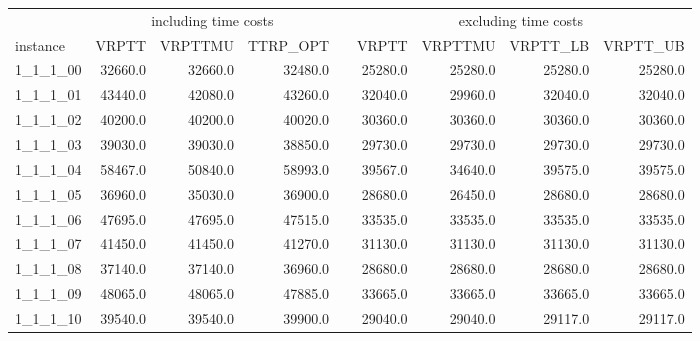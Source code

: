 %
\setlength\LTleft{-1in}
\setlength\LTright{-1in}
%
%
%
\begin{longtable}{lrrrcrrrr}
\toprule
%
& \multicolumn{3}{c}{including time costs} & \phantom{a}& \multicolumn{4}{c}{excluding time costs} \\
\cmidrule{2-4} \cmidrule{6-9}
%
%
%
instance &  VRPTT &  VRPTTMU &  TTRP\_OPT &&  VRPTT &  VRPTTMU &  VRPTT\_LB &  VRPTT\_UB \\
%
\midrule \endhead
1\_1\_1\_00      &     32660.0 &       32660.0 &        32480.0 &&       25280.0 &         25280.0 &          25280.0 &          25280.0 \\
1\_1\_1\_01      &     43440.0 &       42080.0 &        43260.0 &&       32040.0 &         29960.0 &          32040.0 &          32040.0 \\
1\_1\_1\_02      &     40200.0 &       40200.0 &        40020.0 &&       30360.0 &         30360.0 &          30360.0 &          30360.0 \\
1\_1\_1\_03      &     39030.0 &       39030.0 &        38850.0 &&       29730.0 &         29730.0 &          29730.0 &          29730.0 \\
1\_1\_1\_04      &     58467.0 &       50840.0 &        58993.0 &&       39567.0 &         34640.0 &          39575.0 &          39575.0 \\
1\_1\_1\_05      &     36960.0 &       35030.0 &        36900.0 &&       28680.0 &         26450.0 &          28680.0 &          28680.0 \\
1\_1\_1\_06      &     47695.0 &       47695.0 &        47515.0 &&       33535.0 &         33535.0 &          33535.0 &          33535.0 \\
1\_1\_1\_07      &     41450.0 &       41450.0 &        41270.0 &&       31130.0 &         31130.0 &          31130.0 &          31130.0 \\
1\_1\_1\_08      &     37140.0 &       37140.0 &        36960.0 &&       28680.0 &         28680.0 &          28680.0 &          28680.0 \\
1\_1\_1\_09      &     48065.0 &       48065.0 &        47885.0 &&       33665.0 &         33665.0 &          33665.0 &          33665.0 \\
1\_1\_1\_10      &     39540.0 &       39540.0 &        39900.0 &&       29040.0 &         29040.0 &          29117.0 &          29117.0 \\

\end{longtable}
